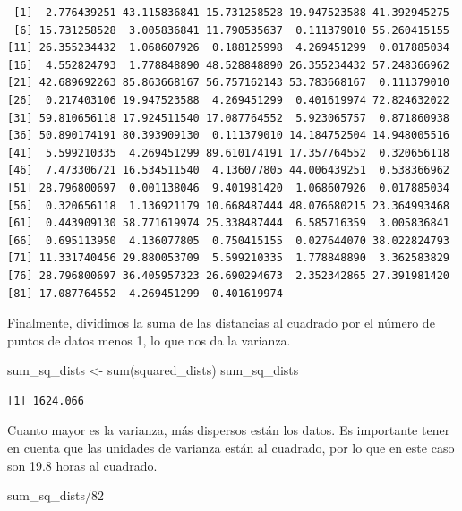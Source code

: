 \documentclass[
  letterpaper,
  DIV=11,
  numbers=noendperiod]{scrreprt}
\newenvironment{Shaded}{\begin{snugshade}}{\end{snugshade}}
\newcommand{\DecValTok}[1]{\textcolor[rgb]{0.68,0.00,0.00}{#1}}
\newcommand{\FunctionTok}[1]{\textcolor[rgb]{0.28,0.35,0.67}{#1}}
\newcommand{\NormalTok}[1]{\textcolor[rgb]{0.00,0.23,0.31}{#1}}
\newcommand{\OtherTok}[1]{\textcolor[rgb]{0.00,0.23,0.31}{#1}}
\newcommand{\SpecialCharTok}[1]{\textcolor[rgb]{0.37,0.37,0.37}{#1}}
\begin{document}
\begin{verbatim}
 [1]  2.776439251 43.115836841 15.731258528 19.947523588 41.392945275
 [6] 15.731258528  3.005836841 11.790535637  0.111379010 55.260415155
[11] 26.355234432  1.068607926  0.188125998  4.269451299  0.017885034
[16]  4.552824793  1.778848890 48.528848890 26.355234432 57.248366962
[21] 42.689692263 85.863668167 56.757162143 53.783668167  0.111379010
[26]  0.217403106 19.947523588  4.269451299  0.401619974 72.824632022
[31] 59.810656118 17.924511540 17.087764552  5.923065757  0.871860938
[36] 50.890174191 80.393909130  0.111379010 14.184752504 14.948005516
[41]  5.599210335  4.269451299 89.610174191 17.357764552  0.320656118
[46]  7.473306721 16.534511540  4.136077805 44.006439251  0.538366962
[51] 28.796800697  0.001138046  9.401981420  1.068607926  0.017885034
[56]  0.320656118  1.136921179 10.668487444 48.076680215 23.364993468
[61]  0.443909130 58.771619974 25.338487444  6.585716359  3.005836841
[66]  0.695113950  4.136077805  0.750415155  0.027644070 38.022824793
[71] 11.331740456 29.880053709  5.599210335  1.778848890  3.362583829
[76] 28.796800697 36.405957323 26.690294673  2.352342865 27.391981420
[81] 17.087764552  4.269451299  0.401619974
\end{verbatim}

Finalmente, dividimos la suma de las distancias al cuadrado por el
número de puntos de datos menos 1, lo que nos da la varianza.

\begin{Shaded}
\begin{Highlighting}[]
\NormalTok{sum\_sq\_dists }\OtherTok{\textless{}{-}} \FunctionTok{sum}\NormalTok{(squared\_dists)}
\NormalTok{sum\_sq\_dists}
\end{Highlighting}
\end{Shaded}

\begin{verbatim}
[1] 1624.066
\end{verbatim}

Cuanto mayor es la varianza, más dispersos están los datos. Es
importante tener en cuenta que las unidades de varianza están al
cuadrado, por lo que en este caso son 19.8 horas al cuadrado.

\begin{Shaded}
\begin{Highlighting}[]
\NormalTok{sum\_sq\_dists}\SpecialCharTok{/}\DecValTok{82}
\end{Highlighting}
\end{Shaded}
\end{document}
